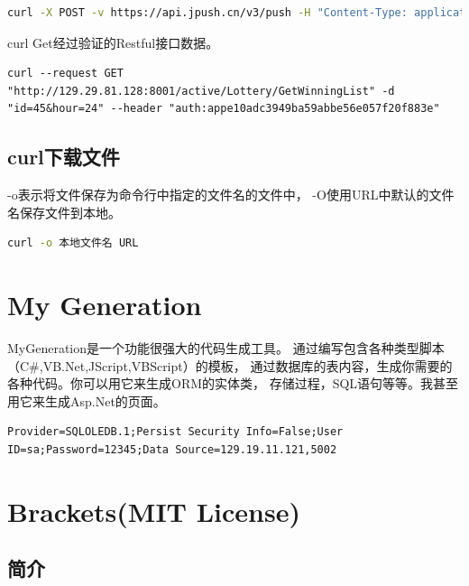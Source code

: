 \documentclass{book}
\begin{document}
\begin{lstlisting}[language=Bash]
curl -X POST -v https://api.jpush.cn/v3/push -H "Content-Type: application/json" -u "7d431e42dfa6a6d693ac2d04:5e987ac6d2e04d95a9d8f0d1" -d '{"platform":"all","audience":"all","notification":{"alert":"Hi,JPush!"}}'
\end{lstlisting}

curl Get经过验证的Restful接口数据。

\begin{lstlisting}
curl --request GET "http://129.29.81.128:8001/active/Lottery/GetWinningList" -d "id=45&hour=24" --header "auth:appe10adc3949ba59abbe56e057f20f883e"
\end{lstlisting}

\subsection{curl下载文件}

-o表示将文件保存为命令行中指定的文件名的文件中，
-O使用URL中默认的文件名保存文件到本地。

\begin{lstlisting}[language=Bash]
curl -o 本地文件名 URL
\end{lstlisting}

\section{My Generation}

MyGeneration是一个功能很强大的代码生成工具。
通过编写包含各种类型脚本（C\#,VB.Net,JScript,VBScript）的模板，
通过数据库的表内容，生成你需要的各种代码。你可以用它来生成ORM的实体类，
存储过程，SQL语句等等。我甚至用它来生成Asp.Net的页面。

\begin{lstlisting}
Provider=SQLOLEDB.1;Persist Security Info=False;User ID=sa;Password=12345;Data Source=129.19.11.121,5002
\end{lstlisting}

\section{Brackets(MIT License)}

\subsection{简介}
\end{document}

